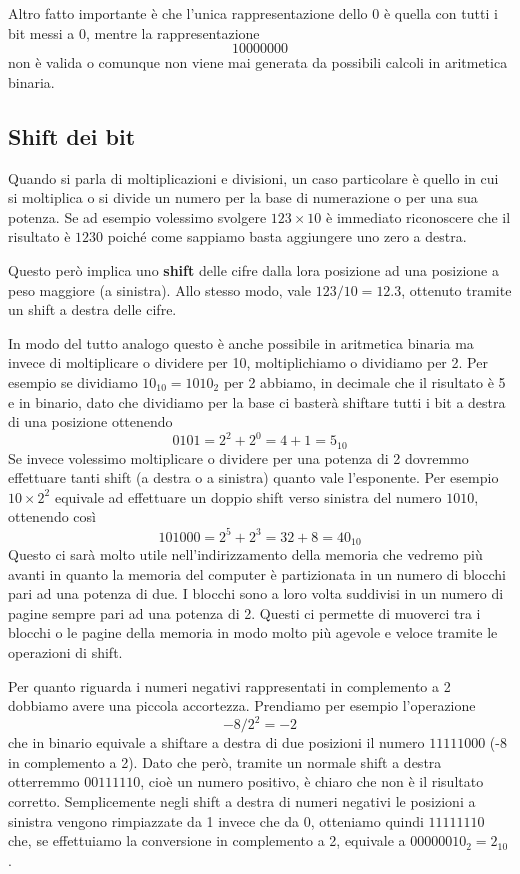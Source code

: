 Altro fatto importante è che l'unica rappresentazione dello 0 è quella con tutti i bit messi a 0,
mentre la rappresentazione
\[ 10000000 \]
non è valida o comunque non viene mai generata da possibili calcoli in aritmetica binaria.

\subsection{Shift dei bit}
Quando si parla di moltiplicazioni e divisioni, un caso particolare è quello in cui si moltiplica
o si divide un numero per la base di numerazione o per una sua potenza. Se ad esempio volessimo
svolgere $123 \times 10$ è immediato riconoscere che il risultato è $1230$ poiché come sappiamo
basta aggiungere uno zero a destra.

Questo però implica uno \textbf{shift} delle cifre dalla lora posizione ad una posizione a peso
maggiore (a sinistra). Allo stesso modo, vale $123 / 10 = 12.3$, ottenuto tramite un shift a destra
delle cifre.

In modo del tutto analogo questo è anche possibile in aritmetica binaria ma invece di moltiplicare
o dividere per 10, moltiplichiamo o dividiamo per 2. Per esempio se dividiamo $10_{10} = 1010_2$
per 2 abbiamo, in decimale che il risultato è 5 e in binario, dato che dividiamo per la base ci
basterà shiftare tutti i bit a destra di una posizione ottenendo
\[ 0101 = 2^2 + 2^0 = 4 + 1 = 5_{10} \]
Se invece volessimo moltiplicare o dividere per una potenza di 2 dovremmo effettuare tanti shift
(a destra o a sinistra) quanto vale l'esponente. Per esempio $10 \times 2^2$ equivale ad effettuare
un doppio shift verso sinistra del numero $1010$, ottenendo così
\[ 101000 = 2^5 + 2^3 = 32 + 8 = 40_{10} \]
Questo ci sarà molto utile nell'indirizzamento della memoria che vedremo più avanti in quanto la
memoria del computer è partizionata in un numero di blocchi pari ad una potenza di due. I blocchi
sono a loro volta suddivisi in un numero di pagine sempre pari ad una potenza di 2. Questi ci
permette di muoverci tra i blocchi o le pagine della memoria in modo molto più agevole e veloce
tramite le operazioni di shift.

Per quanto riguarda i numeri negativi rappresentati in complemento a 2 dobbiamo avere una piccola
accortezza. Prendiamo per esempio l'operazione
\[ -8 / 2^2 = -2 \]
che in binario equivale a shiftare a destra di due posizioni il numero $11111000$ (-8 in
complemento a 2). Dato che però, tramite un normale shift a destra otterremmo $00111110$, cioè un
numero positivo, è chiaro che non è il risultato corretto. Semplicemente negli shift a destra di
numeri negativi le posizioni a sinistra vengono rimpiazzate da 1 invece che da 0, otteniamo quindi
$11111110$ che, se effettuiamo la conversione in complemento a 2, equivale a $00000010_2 = 2_{10}$.


